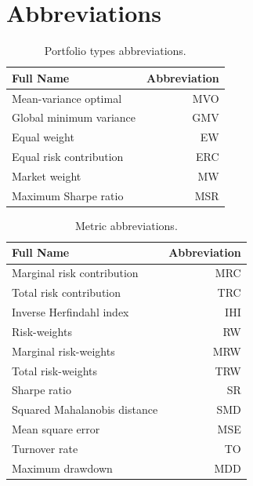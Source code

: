 \documentclass[a4paper,11pt,nocenter,bold,noupper,headcount]{mythesis}
\theoremstyle{plain}
\theoremstyle{definition}
\begin{document}

 



\newpage
\appendix


\chapter{Abbreviations}

\begin{table} [h]
\caption{Portfolio types abbreviations.}
\centering
 \begin{tabular}{l  r} 
\hline
\textbf{Full Name} &  \textbf{Abbreviation}\\ 
 \hline
 Mean-variance optimal & MVO \\
 Global minimum variance & GMV \\
 Equal weight & EW \\
 Equal risk contribution & ERC \\
 Market weight & MW \\
 Maximum Sharpe ratio & MSR \\
 \hline
\end{tabular}
\end{table}

\begin{table} [h]
\caption{Metric abbreviations.}
\centering
 \begin{tabular}{l r} 
 \hline
\textbf{Full Name} &  \textbf{Abbreviation}\\ 
 \hline
 Marginal risk contribution & MRC \\
 Total risk contribution & TRC \\
 Inverse Herfindahl index & IHI \\
 Risk-weights & RW \\
 Marginal risk-weights & MRW \\
 Total risk-weights & TRW \\
 Sharpe ratio & SR \\
 Squared Mahalanobis distance & SMD \\
 Mean square error & MSE \\
 Turnover rate & TO \\
 Maximum drawdown & MDD \\
 \hline
\end{tabular}

\end{table}
\end{document}
